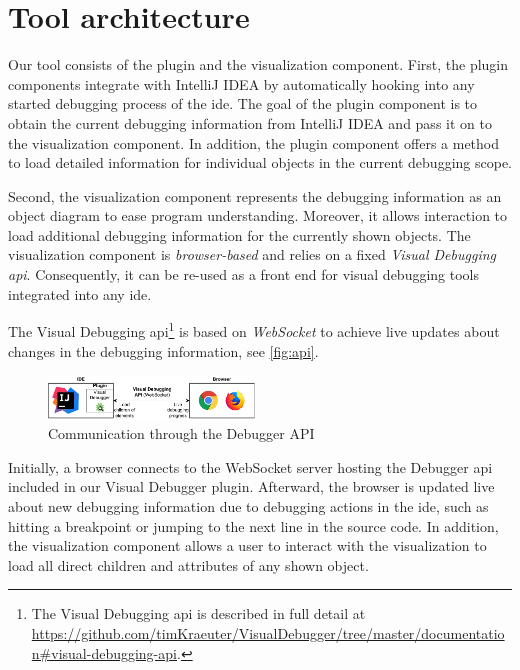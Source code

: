 \documentclass[conference]{IEEEtran}
\newcommand{\intellij}{IntelliJ IDEA}
\begin{document}
\section{Tool architecture}  \label{sec:architecture}
Our tool consists of the plugin and the visualization component.
First, the plugin components integrate with \intellij{} by automatically hooking into any started debugging process of the \gls*{ide}.
The goal of the plugin component is to obtain the current debugging information from \intellij{} and pass it on to the visualization component.
In addition, the plugin component offers a method to load detailed information for individual objects in the current debugging scope.

Second, the visualization component represents the debugging information as an object diagram to ease program understanding.
Moreover, it allows interaction to load additional debugging information for the currently shown objects.
The visualization component is \emph{browser-based} and relies on a fixed \emph{Visual Debugging \gls*{api}}.
Consequently, it can be re-used as a front end for visual debugging tools integrated into any \gls*{ide}.

The Visual Debugging \gls*{api}\footnote{The Visual Debugging \gls*{api} is described in full detail at \url{https://github.com/timKraeuter/VisualDebugger/tree/master/documentation\#visual-debugging-api}.} is based on \emph{WebSocket} to achieve live updates about changes in the debugging information, see \autoref{fig:api}.

\begin{figure}[h]
    \centering
    \includegraphics[width=0.488\textwidth]{images/VD-architecture.pdf}
    \caption{Communication through the Debugger API}
    \label{fig:api}
\end{figure}

Initially, a browser connects to the WebSocket server hosting the Debugger \gls*{api} included in our Visual Debugger plugin.
Afterward, the browser is updated live about new debugging information due to debugging actions in the \gls*{ide}, such as hitting a breakpoint or jumping to the next line in the source code.
In addition, the visualization component allows a user to interact with the visualization to load all direct children and attributes of any shown object.
\end{document}

